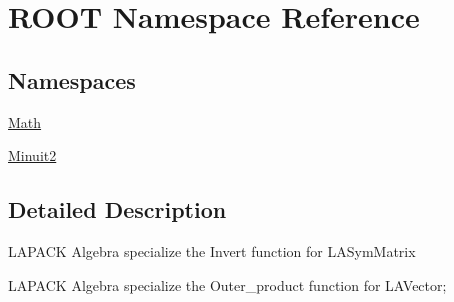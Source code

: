 \hypertarget{namespaceROOT}{}\section{R\+O\+OT Namespace Reference}
\label{namespaceROOT}
\subsection*{Namespaces}
\begin{DoxyCompactItemize}
\item 
 \mbox{\hyperlink{namespaceROOT_1_1Math}{Math}}
\item 
 \mbox{\hyperlink{namespaceROOT_1_1Minuit2}{Minuit2}}
\end{DoxyCompactItemize}


\subsection{Detailed Description}
L\+A\+P\+A\+CK Algebra specialize the Invert function for L\+A\+Sym\+Matrix

L\+A\+P\+A\+CK Algebra specialize the Outer\+\_\+product function for L\+A\+Vector; 